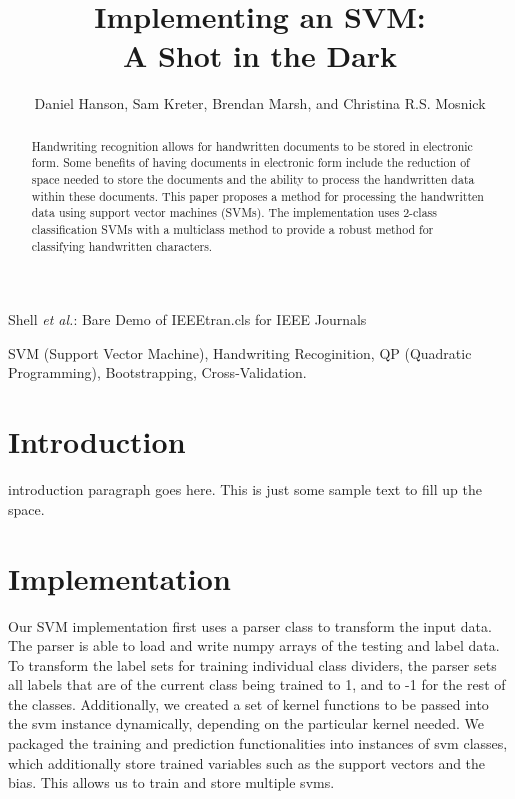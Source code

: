 \documentclass[journal]{IEEEtran}
\begin{document}
\title{Implementing an SVM:\\ A Shot in the Dark}

\author{Daniel Hanson, Sam Kreter, Brendan Marsh, and Christina R.S. Mosnick}

{Shell \MakeLowercase{\textit{et al.}}: Bare Demo of IEEEtran.cls for IEEE Journals}

\maketitle

\begin{abstract}
Handwriting recognition allows for handwritten documents to be stored in electronic form. Some benefits of having documents in electronic form include the reduction of space needed to store the documents and the ability to process the handwritten data within these documents. This paper proposes a method for processing the handwritten data using support vector machines (SVMs). The implementation uses 2-class classification SVMs with a multiclass method to provide a robust method for classifying handwritten characters.
\end{abstract}

\begin{IEEEkeywords}
    SVM (Support Vector Machine), Handwriting Recoginition, QP (Quadratic Programming), Bootstrapping, Cross-Validation.
\end{IEEEkeywords}

\IEEEpeerreviewmaketitle

\section{Introduction}

 introduction paragraph goes here. This is just some sample text to fill up the space.



\section{Implementation}
    Our SVM implementation first uses a parser class to transform the input data.  The parser is able to load and write numpy arrays of the testing and label data.  To transform the label sets for training individual class dividers, the parser sets all labels that are of the current class being trained to 1, and to -1 for the rest of the classes.  Additionally, we created a set of kernel functions to be passed into the svm instance dynamically, depending on the particular kernel needed.  We packaged the training and prediction functionalities into instances of svm classes, which additionally store trained variables such as the support vectors and the bias.  This allows us to train and store multiple svms.\\
\end{document}
